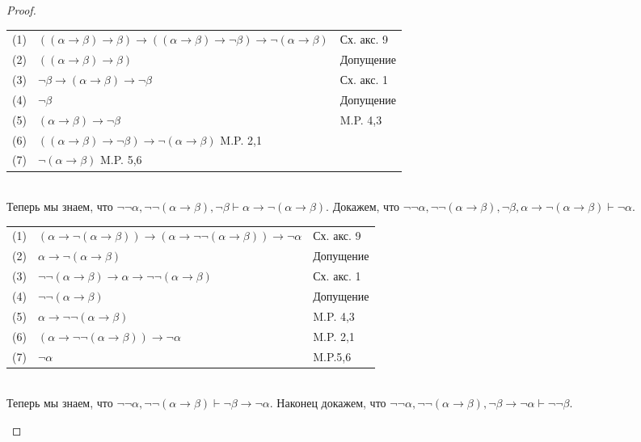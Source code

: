 \begin{proof}
\begin{enumerate}
\begin{itemize}
\begin{tabular}{lll}
(1) &$((\alpha \rightarrow \beta) \rightarrow \beta) \rightarrow ((\alpha \rightarrow \beta) \rightarrow \neg \beta) \rightarrow \neg(\alpha \rightarrow \beta)$& Сх. акс. 9\\
(2) &$((\alpha \rightarrow \beta) \rightarrow \beta)$& Допущение\\
(3) &$\neg \beta \rightarrow (\alpha \rightarrow \beta) \rightarrow \neg \beta$& Сх. акс. 1\\
(4) &$\neg \beta$& Допущение\\
(5) &$(\alpha \rightarrow \beta) \rightarrow \neg \beta$& M.P. 4,3\\
(6) &$((\alpha \rightarrow \beta) \rightarrow \neg \beta) \rightarrow \neg(\alpha \rightarrow \beta)$ M.P. 2,1\\
(7) &$\neg(\alpha \rightarrow \beta)$ M.P. 5,6\\
\end{tabular}\\
Теперь мы знаем, что $\neg \neg \alpha, \neg \neg (\alpha \rightarrow \beta), \neg \beta \vdash \alpha \rightarrow \neg (\alpha \rightarrow \beta)$. Докажем, что $\neg \neg \alpha, \neg \neg (\alpha \rightarrow \beta), \neg \beta, \alpha \rightarrow \neg (\alpha \rightarrow \beta) \vdash \neg \alpha$.\\
\begin{tabular}{lll}
(1) &$(\alpha \rightarrow \neg (\alpha \rightarrow \beta)) \rightarrow (\alpha \rightarrow \neg \neg (\alpha \rightarrow \beta)) \rightarrow \neg \alpha$& Сх. акс. 9\\
(2) &$\alpha \rightarrow \neg (\alpha \rightarrow \beta)$&Допущение\\
(3) &$\neg \neg (\alpha \rightarrow \beta) \rightarrow \alpha \rightarrow \neg \neg (\alpha \rightarrow \beta)$& Сх. акс. 1\\
(4) &$\neg \neg (\alpha \rightarrow \beta)$& Допущение\\
(5) &$\alpha \rightarrow \neg \neg (\alpha \rightarrow \beta)$& M.P. 4,3\\
(6) &$(\alpha \rightarrow \neg \neg (\alpha \rightarrow \beta)) \rightarrow \neg \alpha$& M.P. 2,1\\
(7) &$\neg \alpha$& M.P.5,6\\
\end{tabular}\\
Теперь мы знаем, что $\neg \neg \alpha, \neg \neg (\alpha \rightarrow \beta) \vdash \neg \beta \rightarrow \neg \alpha$. Наконец докажем, что $\neg \neg \alpha, \neg \neg (\alpha \rightarrow \beta), \neg \beta \rightarrow \neg \alpha \vdash \neg \neg \beta$.\\

\end{itemize}
\end{enumerate}
\end{proof}
